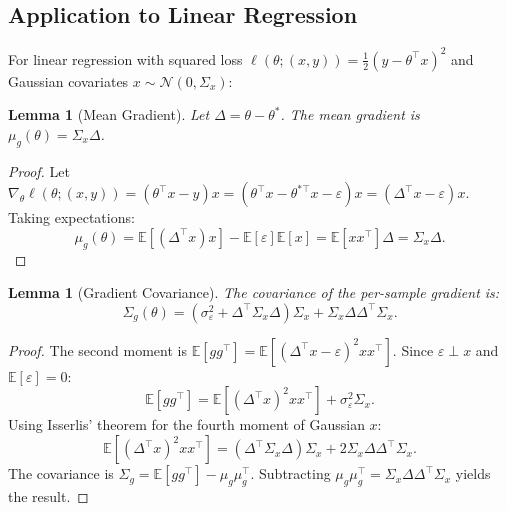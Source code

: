 \documentclass{article}
\theoremstyle{plain}
\newtheorem{lemma}[theorem]{Lemma}
\theoremstyle{definition}
\theoremstyle{remark}
\newcommand{\EE}{\ensuremath{\mathbb{E}}}
\newcommand{\cN}{\ensuremath{\mathcal{N}}}
\renewcommand{\epsilon}{\varepsilon}
\begin{document}
\subsection{Application to Linear Regression}

For linear regression with squared loss $\ell(\theta; (x,y)) = \frac{1}{2}(y - \theta^\top x)^2$ and Gaussian covariates $x \sim \cN(0, \Sigma_x)$:

\begin{lemma}[Mean Gradient]
    \label{lem:linreg-mean-grad}
    Let $\Delta = \theta - \theta^*$. The mean gradient is $\mu_g(\theta) = \Sigma_x \Delta$.
\end{lemma}

\begin{proof}
    Let $\nabla_\theta \ell(\theta; (x,y)) = (\theta^\top x - y)x = (\theta^\top x - \theta^{*\top}x - \epsilon)x = (\Delta^\top x - \epsilon)x$.
    Taking expectations:
    \begin{equation*}
        \mu_g(\theta) = \EE[(\Delta^\top x)x] - \EE[\epsilon]\EE[x] = \EE[xx^\top]\Delta = \Sigma_x \Delta.
    \end{equation*}
\end{proof}

\begin{lemma}[Gradient Covariance]
    \label{lem:linreg-cov-grad}
    The covariance of the per-sample gradient is:
    \begin{equation*}
        \Sigma_g(\theta) = (\sigma_\epsilon^2 + \Delta^\top \Sigma_x \Delta)\Sigma_x + \Sigma_x \Delta \Delta^\top \Sigma_x.
    \end{equation*}
\end{lemma}

\begin{proof}
    The second moment is $\EE[gg^\top] = \EE[(\Delta^\top x - \epsilon)^2 xx^\top]$. Since $\epsilon \perp x$ and $\EE[\epsilon]=0$:
    \begin{equation*}
        \EE[gg^\top] = \EE[(\Delta^\top x)^2 xx^\top] + \sigma_\epsilon^2 \Sigma_x.
    \end{equation*}
    Using Isserlis' theorem for the fourth moment of Gaussian $x$:
    \begin{equation*}
        \EE[(\Delta^\top x)^2 xx^\top] = (\Delta^\top \Sigma_x \Delta)\Sigma_x + 2\Sigma_x \Delta \Delta^\top \Sigma_x.
    \end{equation*}
    The covariance is $\Sigma_g = \EE[gg^\top] - \mu_g\mu_g^\top$. Subtracting $\mu_g\mu_g^\top = \Sigma_x \Delta \Delta^\top \Sigma_x$ yields the result.
\end{proof}
\end{document}
